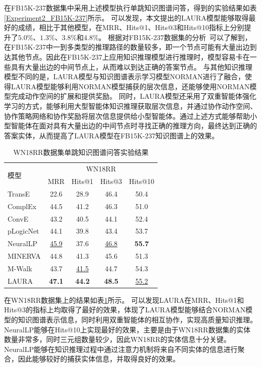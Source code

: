 \documentclass[algorithmlist, AutoFakeBold, AutoFakeSlant, figurelist, tablelist, nomlist, engineering, openany]{seuthesix} %
\begin{document}
在FB15K-237数据集中采用上述模型执行单跳知识图谱问答，得到的实验结果如表\ref{Experiment2_FB15K-237}所示。
可以发现，本文提出的LAURA模型能够取得最好的成绩，相比于其他模型，在MRR、Hits@1、Hits@3和Hits@10指标上分别提升了$5.0\%$、$1.3\%$、$3.8\%$和$4.8\%$。
根据对FB15K-237数据集的分析~\cite{wan2021reasoning}可以了解到，在FB15K-237中一到多类型的推理路径的数量较多，即一个节点可能有大量出边到达其他节点。因此在FB15K-237上应用知识推理模型进行推理时，模型容易卡在一些具有大量出边的中间节点上，从而难以到达正确的答案节点。
与其他知识推理模型不同的是，LAURA模型与知识图谱表示学习模型NORMAN进行了融合，使得LAURA模型能够利用NORMAN模型捕获的层次信息，还能够使用NORMAN模型完成动作空间的扩展和提供奖励。
同时，LAURA模型还采用了双重智能体强化学习的方式，能够利用大型智能体知识推理获取层次信息，并通过协作动作空间、协作策略网络和协作奖励将层次信息提供给小型智能体。通过上述方式能够帮助小型智能体在面对具有大量出边的中间节点时寻找正确的推理方向，最终达到正确的答案实体，从而提高了LAURA模型在FB15K-237知识图谱上的效果。

\begin{table}[t]
  \centering
  \caption{WN18RR数据集单跳知识图谱问答实验结果}
  \begin{tabular*}{0.95\textwidth}{@{\extracolsep{\fill}}lcccc}
    \toprule[1pt]
    \multirow{2}{*}{模型} & \multicolumn{4}{c}{WN18RR}   \\
      & MRR & Hits@1 & Hits@3 & Hits@10 \\ \hline
    TransE & 22.6 & 28.9 & 46.4 & 50.4 \\
    ComplEx & 44.5 & 41.2 & 46.3 & 51.0 \\
    ConvE & 43.2 & 40.5 & 44.1 & 52.4 \\
    pLogicNet & 44.1 & 39.8 & 43.4 & 53.7 \\
    NeuralLP & \underline{45.9} & 37.6 & \underline{46.8} & \textbf{55.7} \\
    MINERVA & 44.8 & 41.3 & 45.6 & 51.3 \\
    M-Walk & 43.7 & \underline{41.5} & 44.7 & 54.3 \\
    LAURA & \textbf{47.1} & \textbf{44.2} & \textbf{48.5} & \underline{55.2} \\
    \bottomrule[1pt]
  \end{tabular*}
  \label{Experiment2_WN18RR}
\end{table}

在WN18RR数据集上的结果如表\ref{Experiment2_WN18RR}所示。
可以发现LAURA在MRR、Hits@1和Hits@3的指标上均取得了最好的效果，体现了LAURA模型能够结合NORMAN模型的知识图谱表示信息，同时利用双重智能体的相互协作，实现高质量知识推理。
NeuralLP能够在Hits@10上实现最好的效果，主要是由于WN18RR数据集的实体数量非常多，同时三元组数量较少，因此WN18RR的实体信息十分关键。NeuralLP能够在知识推理过程中通过注意力机制将来自不同实体的信息进行聚合，因此能够较好的捕获实体信息，并取得良好的效果。
\end{document}
